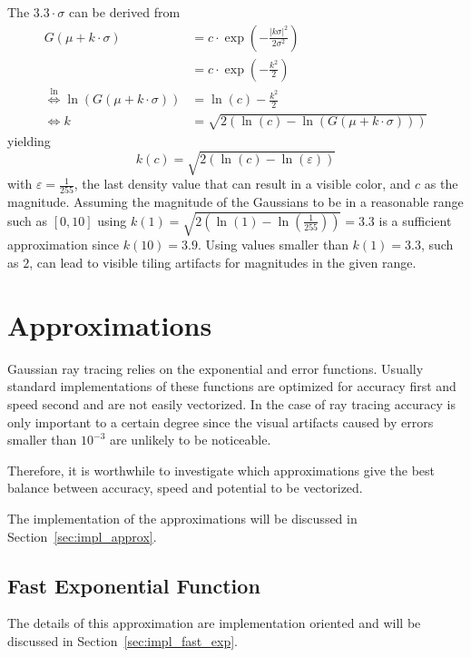 \documentclass[a4paper, 11pt]{memoir}
\begin{document}
    The $3.3 \cdot \sigma$ can be derived from
    \begin{align}
        G(\mu + k \cdot \sigma) &= c \cdot \exp{\left(-\frac{|k \sigma|^2}{2\sigma^2}\right)}\\
        &= c \cdot \exp{\left(-\frac{k^2}{2}\right)}\\
        \overset{\ln}{\iff} \ln{\left( G(\mu + k\cdot\sigma) \right)} &= \ln{(c)} - \frac{k^2}{2}\\
        \iff k &= \sqrt{2\left(\ln{(c)} - \ln{\left( G(\mu + k\cdot\sigma) \right)}\right)}
    \end{align}
    yielding
    \begin{equation}
        k(c) = \sqrt{2(\ln{(c)} - \ln{(\varepsilon)})}
        \label{eq:sig_lim}
    \end{equation}
    with $\varepsilon = \frac{1}{255}$, the last density value that can result in a visible color, and $c$ as the
    magnitude. Assuming the magnitude of the Gaussians to be in a reasonable range such as $[0, 10]$ using $k(1) =
    \sqrt{2(\ln{(1)} - \ln{(\frac{1}{255})})} = 3.3$ is a sufficient approximation since $k(10) = 3.9$. Using values
    smaller than $k(1) = 3.3$, such as $2$, can lead to visible tiling artifacts for magnitudes in the given range.

    \chapter{Approximations}
    \label{ch:approximations}
    Gaussian ray tracing relies on the exponential and error functions. Usually standard implementations of these
    functions are optimized for accuracy first and speed second and are not easily vectorized. In the case of ray
    tracing accuracy is only important to a certain degree since the visual artifacts caused by errors smaller than
    $10^{-3}$ are unlikely to be noticeable.

    Therefore, it is worthwhile to investigate which approximations give the best balance between accuracy, speed and
    potential to be vectorized.

    The implementation of the approximations will be discussed in Section~\ref{sec:impl_approx}.

    \section{Fast Exponential Function}
    \label{sec:fast_exp}
    The details of this approximation are implementation oriented and will be discussed in Section~\ref{sec:impl_fast_exp}.
    
\end{document}
